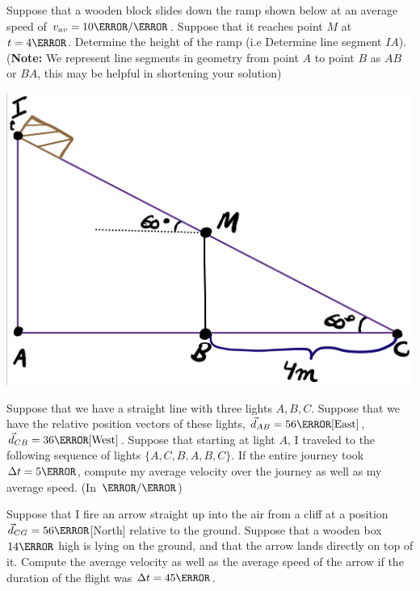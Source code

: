 \documentclass[12pt]{article} %
\newcommand{\tx}[1]{\text{#1}}
\begin{document}
\begin{qstn}[6]


\end{qstn}



\begin{qstn}[7]
Suppose that a wooden block slides down the ramp shown below at an average speed of $v_{av} = 10 \m / \s$. Suppose that it reaches point $M$ at $t = 4\s$.  Determine the height of the ramp (i.e Determine line segment $IA$).\\ (\textbf{Note: }We represent line segments in geometry from point $A$ to point $B$ as $AB$ or $BA$, this may be helpful in shortening your solution)

	\includegraphics[width=\textwidth]{ramp.jpg}

\end{qstn}


\begin{qstn}[8]
Suppose that we have a straight line with three lights $A,B,C$. Suppose that we have the relative position vectors of these lights, $\vec d_{AB} = 56\m\tx{[East]}$, $\vec d_{CB} = 36\m\tx{[West]}$. Suppose that starting at light $A$, I traveled to the following sequence of lights $\{A,C,B,A,B,C\}$. If the entire journey took $\Delta t = 5\m$, compute my average velocity over the journey as well as my average speed. (In $\m / \s$) 

\end{qstn}


\begin{qstn}[9]
Suppose that I fire an arrow straight up into the air from a cliff at a position $\vec d_{CG} = 56\m$[North] relative to the ground. Suppose that a wooden box $14\m$ high is lying on the ground, and that the arrow lands directly on top of it. Compute the average velocity as well as the average speed of the arrow if the duration of the flight was $\Delta t = 45\s$. 
\end{qstn}
\end{document}

